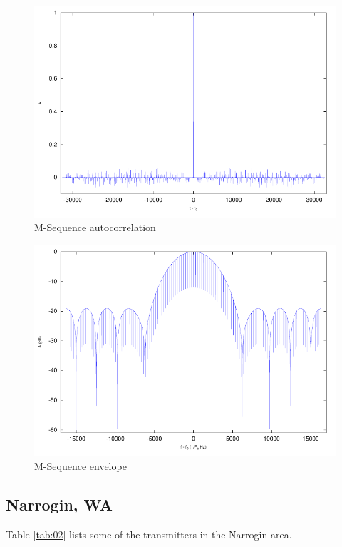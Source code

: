 \documentclass[a4paper]{report}
\numberwithin{equation}{chapter}
\begin{document}
\begin{figure}
\centering 
\includegraphics{Passive-Weather-Radar-Theory-fig-08.pdf}
\caption[M-Sequence autocorrelation]{M-Sequence autocorrelation}
\label{fig:08}
\end{figure}

\begin{figure}
\centering 
\includegraphics{Passive-Weather-Radar-Theory-fig-09.pdf}
\caption[M-Sequence envelope]{M-Sequence envelope}
\label{fig:09}
\end{figure}

\subsection[Narrogin, WA]{Narrogin, WA}

Table \ref{tab:02} lists some of the transmitters in the  Narrogin area.
\end{document}
